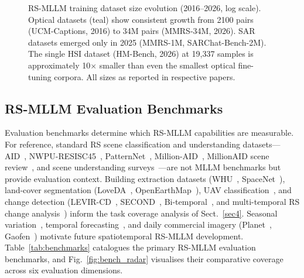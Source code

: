 \begin{figure}[h]
\caption{RS-MLLM training dataset size evolution (2016--2026, log scale).
Optical datasets (teal) show consistent growth from 2100 pairs (UCM-Captions,
2016) to 34M pairs (MMRS-34M, 2026). SAR datasets emerged only in 2025
(MMRS-1M, SARChat-Bench-2M). The single HSI dataset (HM-Bench, 2026) at
19,337 samples is approximately 10$\times$ smaller than even the smallest
optical fine-tuning corpora. All sizes as reported in respective
papers.}\label{fig:dataset_growth}
\end{figure}

\subsection{RS-MLLM Evaluation Benchmarks}\label{sec8:benchmarks}

Evaluation benchmarks determine which RS-MLLM capabilities are measurable. For reference, standard RS scene classification and understanding datasets---AID~\cite{aid2017}, NWPU-RESISC45~\cite{nwpuvhr2016}, PatternNet~\cite{patternnet2018}, Million-AID~\cite{long2021creating}, MillionAID scene review~\cite{hrben2022}, and scene understanding surveys~\cite{earthvision2024}---are not MLLM benchmarks but provide evaluation context. Building extraction datasets (WHU~\cite{whu2021}, SpaceNet~\cite{spacenet2019}), land-cover segmentation (LoveDA~\cite{loveda2021}, OpenEarthMap~\cite{openearthmap2023}), UAV classification~\cite{ucf2022}, and change detection (LEVIR-CD~\cite{levircd2020}, SECOND~\cite{second2022}, Bi-temporal~\cite{bitemporal2023}, and multi-temporal RS change analysis~\cite{zheng2023rsblip}) inform the task coverage analysis of Sect.~\ref{sec4}. Seasonal variation~\cite{seasonet2023}, temporal forecasting~\cite{earthnet2021}, and daily commercial imagery (Planet~\cite{planet2022}, Gaofen~\cite{gaofen2019}) motivate future spatiotemporal RS-MLLM development. Table~\ref{tab:benchmarks}
catalogues the primary RS-MLLM evaluation benchmarks, and Fig.~\ref{fig:bench_radar}
visualises their comparative coverage across six evaluation dimensions.

